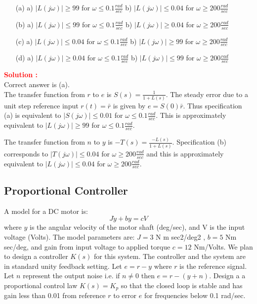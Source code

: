\documentclass[12pt]{article}
\begin{document}
\begin{itemize}
    \item[(a)] a) $|L(j\omega)| \geq 99$ for $\omega \leq 0.1 \frac{rad}{sec}$ b) $|L(j\omega)| \leq 0.04$ for $\omega \geq 200 \frac{rad}{sec}$ 
    \item[(b)] a) $|L(j\omega)| \leq 99$ for $\omega \leq 0.1 \frac{rad}{sec}$ b) $|L(j\omega)| \geq 0.04$ for $\omega \geq 200 \frac{rad}{sec}$ 
    \item[(c)] a) $|L(j\omega)| \leq 0.04$ for $\omega \leq 0.1 \frac{rad}{sec}$ b) $|L(j\omega)| \geq 99$ for $\omega \geq 200 \frac{rad}{sec}$ 
    \item[(d)] a) $|L(j\omega)| \geq 0.04$ for $\omega \leq 0.1 \frac{rad}{sec}$ b) $|L(j\omega)| \leq 99$ for $\omega \geq 200 \frac{rad}{sec}$ 
\end{itemize}
\textbf{\textcolor{red}{Solution :}} \\
Correct answer is (a).\\
The transfer function from $r$ to $e$ is $S(s) =\frac{1}{1 + L(s)}$. The steady error due to a
unit step reference input $r(t) = \bar{r}$ is given by $e = S(0) \bar{r}$. Thus specification (a) is equivalent to $|S(j\omega)| \leq 0.01$ for $\omega \leq 0.1 \frac{rad}{sec}$. This is approximately equivalent to $|L(j\omega)| \geq 99$ for $\omega \leq 0.1 \frac{rad}{sec}$.

The transfer function from $n$ to $y$ is $-T(s) =\frac{-L(s)}{1+L(s)}$. Specification (b) corresponds to $|T(j\omega)| \leq 0.04$ for $\omega \geq 200 \frac{rad}{sec}$ and this is approximately equivalent to $|L(j\omega)| \leq 0.04$ for $\omega \geq 200 \frac{rad}{sec}$.
\clearpage

\subsection{Proportional Controller}

A model for a DC motor is:
$$J \dot{y} + by = c V $$
where $y$ is the angular velocity of the motor shaft (deg/sec), and V is the input voltage (Volts).
The model parameters are: $J=3$ N m sec2/deg2 , $b=5$ Nm sec/deg, and gain from input voltage to applied torque $c=12$ Nm/Volts. We plan to design a controller $K(s)$ for this system. The controller and the system are in standard unity feedback setting. Let $e=r-y$ where $r$ is the reference signal. Let $n$ represent the output noise i.e. if $n \neq 0$ then $e=r-(y+n)$. Design a a proportional control law $K(s) = K_p$ so that the closed loop is stable and has gain less than 0.01 from reference $r$ to error $e$ for frequencies below 0.1 rad/sec.
    
\end{document}
